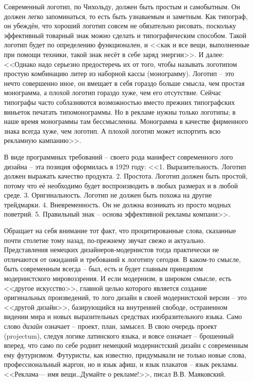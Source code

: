Современный логотип, по Чихольду, должен быть простым и самобытным. Он должен легко запоминаться, то
есть быть узнаваемым и заметным. Как типограф, он убеждён, что хороший логотип совсем не обязательно
рисовать, поскольку эффективный товарный знак можно сделать и типографическим способом. Такой
логотип будет по определению функционален, и <<как и все вещи, выполненные при помощи техники, такой
знак несёт в себе заряд энергии>>\autocite[][118]{chihold2011}. И далее: <<Однако надо серьезно
предостеречь их от того, чтобы называть логотипом простую комбинацию литер из наборной кассы
(монограмму). Логотип -- это нечто совершенно иное, он вмещает в себя гораздо больше смысла, чем
простая монограмма, а плохой логотип гораздо хуже, чем его отсутствие. Сейчас типографы часто
соблазняются возможностью вместо прежних типографских виньеток печатать типомонограммы. Но в рекламе
нужны только логотипы; в наше время монограммы там бессмысленны. Монограмма в качестве фирменного
знака всегда хуже, чем логотип. А плохой логотип может испортить всю рекламную кампанию>>.
\autocite[][119]{chihold2011}

В виде программных требований -- своего рода манифест современного лого дизайна -- эта позиция
оформилась в 1929 году: <<1. Выразительность. Логотип должен выражать качество
продукта. 2. Простота. Логотип должен быть простой, потому что её необходимо будет воспроизводить в
любых размерах и в любой среде. 3. Оригинальность. Логотип не должен быть похожа на другие
трейдмарки. 4. Вневременность. Он не должна возникать из просто модных поветрий. 5. Правильный знак
– основа эффективной рекламы компани>>. \autocite{cabarga1982treasury}

Обращает на себя внимание тот факт, что процитированные слова, сказанные почти столетие тому назад,
по-прежнему звучат свежо и актуально. Представления немецких дизайнеров-модернистов тогда
практически не отличаются от ожиданий и требований к логотипу сегодня. В каком-то смысле, быть
современным всегда -- был, есть и будет главным принципом модернистского мировоззрения. И если
модернизм, в широком смысле, есть <<другое искусство>>, главной целью которого является создание
оригинальных произведений, то лого дизайн в своей модернистской версии -- это <<другой дизайн>>,
базирующийся на внутренней свободе, остраненном видении мира и новых выразительных средствах
изобразительного языка. Само слово \emph{дизайн} означает -- проект, план, замысел. В свою очередь
проект (projectum), следуя логике латинского языка, и вовсе означает -- брошенный вперед\autocite[][323]{serov2005}, что само
по себе роднит немецкий модернистский дизайн с современным ему футуризмом. Футуристы, как известно,
придумывали не только новые слова, профессиональный жаргон, но и язык афиш, и язык плакатов -- язык
рекламы. <<Реклама--– имя вещи\ldots Думайте о рекламе!>>, писал
В.В. Маяковский.\autocite{mayakovsky1959}

